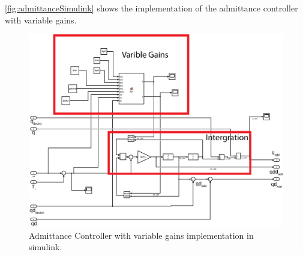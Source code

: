  \autoref{fig:admittanceSimulink} shows the implementation of the admittance controller with variable gains. 
 
\begin{figure}[h]
     \centering
     \includegraphics[width=\textwidth]{images/appendix/addmittance_simulink.png}
     \caption[Simulink Admittance Controller]{Admittance Controller with variable gains implementation in simulink.}
    \label{fig:admittanceSimulink}
\end{figure}












